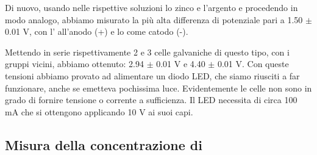 Di nuovo, usando nelle rispettive soluzioni lo zinco e l'argento e procedendo in modo analogo,
abbiamo misurato la più alta differenza di potenziale pari a 1.50 $\pm$ 0.01 V,
con l' all'anodo (+) e lo  come catodo (-).

Mettendo in serie rispettivamente 2 e 3 celle galvaniche di questo tipo, con i gruppi vicini,
abbiamo ottenuto: 2.94 $\pm$ 0.01 V e 4.40 $\pm$ 0.01 V. Con queste tensioni abbiamo provato ad alimentare un
diodo LED, che siamo riusciti a far funzionare, anche se emetteva pochissima luce. Evidentemente
le celle non sono in grado di fornire tensione o corrente a sufficienza. Il LED necessita di circa 100 mA
che si ottengono applicando 10 V ai suoi capi.

\subsection*{Misura della concentrazione di }
